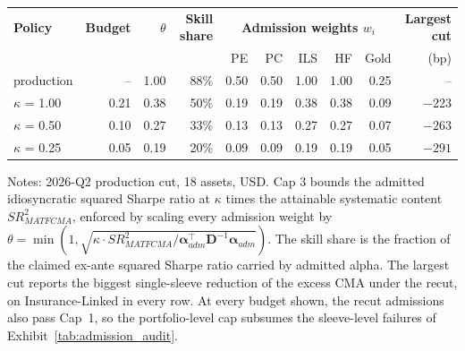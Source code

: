 \begin{table}[H]
	\label{tab:cap3_grid}\vspace*{-0.5\baselineskip}
	\begin{center}
		\footnotesize
		\begin{tabular}{l rrr rrrrr r}
			\toprule
			\textbf{Policy} & \textbf{Budget} & $\theta$ & \textbf{Skill share} & \multicolumn{5}{c}{\textbf{Admission weights $w_i$}} & \textbf{Largest cut} \\
			& & & & PE & PC & ILS & HF & Gold & (bp) \\
			\midrule
			production & -- & 1.00 & 88\% & 0.50 & 0.50 & 1.00 & 1.00 & 0.25 & -- \\
			$\kappa$ = 1.00 & 0.21 & 0.38 & 50\% & 0.19 & 0.19 & 0.38 & 0.38 & 0.09 & $-223$ \\
			$\kappa$ = 0.50 & 0.10 & 0.27 & 33\% & 0.13 & 0.13 & 0.27 & 0.27 & 0.07 & $-263$ \\
			$\kappa$ = 0.25 & 0.05 & 0.19 & 20\% & 0.09 & 0.09 & 0.19 & 0.19 & 0.05 & $-291$ \\
			\bottomrule
		\end{tabular}
	\end{center}
	\vspace*{-0.5\baselineskip}
	{\footnotesize Notes: 2026-Q2 production cut, 18 assets, USD. Cap 3 bounds the admitted idiosyncratic squared Sharpe ratio at $\kappa$ times the attainable systematic content $SR^2_{MATFCMA}$, enforced by scaling every admission weight by $\theta = \min(1, \sqrt{\kappa \cdot SR^2_{MATFCMA} / \boldsymbol\alpha_{adm}^{\intercal}\boldsymbol D^{-1}\boldsymbol\alpha_{adm}})$. The skill share is the fraction of the claimed ex-ante squared Sharpe ratio carried by admitted alpha. The largest cut reports the biggest single-sleeve reduction of the excess CMA under the recut, on Insurance-Linked in every row. At every budget shown, the recut admissions also pass Cap~1, so the portfolio-level cap subsumes the sleeve-level failures of Exhibit~\ref{tab:admission_audit}.}
\end{table}